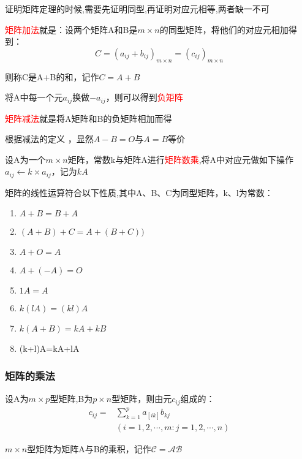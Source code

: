 \begin{keypoint}
	证明矩阵定理的时候,需要先证明同型,再证明对应元相等,两者缺一不可
\end{keypoint}

\begin{information}
\textcolor{red}{矩阵加法}就是：设两个矩阵A和B是$m\times n$的同型矩阵，将他们的对应元相加得到：
\begin{equation*}
C=(a_{ij}+b_{ij})_{m\times n}=(c_{ij})_{m\times n}
\end{equation*}

则称C是A+B的和，记作$C=A+B$

\end{information}

将A中每一个元$a_{ij}$换做$-a_{ij}$，则可以得到\textcolor{red}{负矩阵}

\textcolor{red}{矩阵减法}就是将A矩阵和B的负矩阵相加而得

根据减法的定义 ，显然$A-B=O$与$A=B$等价

\begin{information}
	设A为一个$m\times n$矩阵，常数k与矩阵A进行\textcolor{red}{矩阵数乘},将A中对应元做如下操作$a_{ij}\leftarrow k\times a_{ij}$，记为$kA$
\end{information}

矩阵的线性运算符合以下性质,其中A、B、C为同型矩阵，k、l为常数：

\begin{enumerate}
	\item {$A+B=B+A$}
	\item {$(A+B)+C=A+(B+C))$}
	\item {$A+O=A$}
	\item {$A+(-A)=O$}
	\item {$1A=A$}
	\item {$k(lA)=(kl)A$}
	\item {$k(A+B)=kA+kB$}
	\item {(k+l)A=kA+lA}
\end{enumerate}

\subsubsection{矩阵的乘法}


\begin{keypoint}
	设A为$m\times p$型矩阵,B为$p\times n$型矩阵，则由元$c_{ij}$组成的：
	\begin{equation*}
		\begin{aligned}
			c_{ij}=&\sum_{k=1}^{p} a_[ik]b_{kj}\\
			&(i=1,2,\cdots,m:j=1,2,\cdots,n)
		\end{aligned}
	\end{equation*}

	$m\times n$型矩阵为矩阵A与B的乘积，记作$\mathcal{C=AB}$
\end{keypoint}

